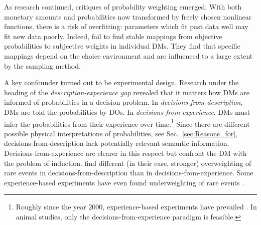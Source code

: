 \documentclass[12pt,letter,timesnewroman]{article}
\newcommand{\seclabel}[1]{\label{sec:#1}}
\newcommand{\secref}[1]{Sec.~\ref{sec:#1}}
\begin{document}
As research continued, critiques of probability weighting emerged. With both monetary amounts and probabilities now transformed by freely chosen nonlinear functions, there is a risk of overfitting: parameters which fit past data well may fit new data poorly. Indeed, \textcite{StewartETAL2015} fail to find stable mappings from objective probabilities to subjective weights in individual DMs. They find that specific mappings depend on the choice environment and are influenced to a large extent by the sampling method.

A key confounder turned out to be experimental design. Research under the heading of the \textit{description-experience gap} revealed that it matters how DMs are informed of probabilities in a decision problem. In \textit{decisions-from-description}, DMs are told the probabilities by DOs. In \textit{decisions-from-experience}, DMs must infer the probabilities from their experience over time.\footnote{Roughly since the year 2000, experience-based experiments have prevailed \parencite{HertwigETAL2004,HertwigErev2009,ErevETAL2010}. In animal studies, only the decisions-from-experience paradigm is feasible.} Since there are different possible physical interpretations of probabilities, see \secref{Reasons_for}, decisions-from-description lack potentially relevant semantic information. Decisions-from-experience are clearer in this respect but confront the DM with the problem of induction. \textcite{HertwigETAL2004} find different (in their case, stronger) overweighting of rare events in decisions-from-description than in decisions-from-experience. Some experience-based experiments have even found underweighting of rare events \parencites{UngemachETAL2009}[esp.~Tab.~9]{WulffETAL2018}.
\end{document}
